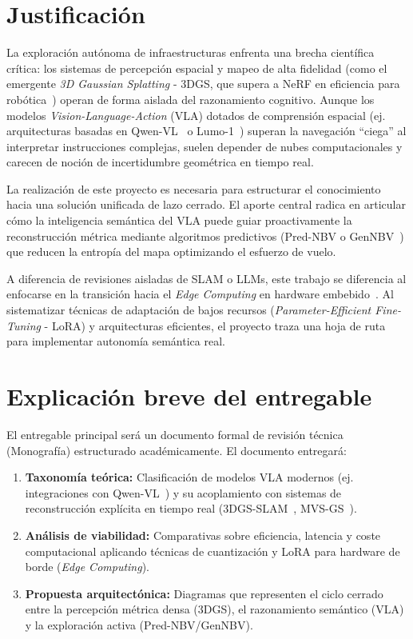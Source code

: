 \documentclass[12pt,a4paper]{article}
\begin{document}
	\section{Justificación}
	\label{sec:justificacion}
	
	La exploración autónoma de infraestructuras enfrenta una brecha científica crítica: los sistemas de percepción espacial y mapeo de alta fidelidad (como el emergente \textit{3D Gaussian Splatting} - 3DGS, que supera a NeRF en eficiencia para robótica~\cite{atik2025comparative, liu2025survey3dgs}) operan de forma aislada del razonamiento cognitivo. Aunque los modelos \textit{Vision-Language-Action} (VLA) dotados de comprensión espacial (ej. arquitecturas basadas en Qwen-VL~\cite{bai2025qwen3vl} o Lumo-1~\cite{astribot2025lumo}) superan la navegación ``ciega'' al interpretar instrucciones complejas, suelen depender de nubes computacionales y carecen de noción de incertidumbre geométrica en tiempo real.
	
	La realización de este proyecto es necesaria para estructurar el conocimiento hacia una solución unificada de lazo cerrado. El aporte central radica en articular cómo la inteligencia semántica del VLA puede guiar proactivamente la reconstrucción métrica mediante algoritmos predictivos (Pred-NBV o GenNBV~\cite{dhami2023prednbv, chen2024gennbv}) que reducen la entropía del mapa optimizando el esfuerzo de vuelo.
	
	A diferencia de revisiones aisladas de SLAM o LLMs, este trabajo se diferencia al enfocarse en la transición hacia el \textit{Edge Computing} en hardware embebido~\cite{zhang2025autonomous}. Al sistematizar técnicas de adaptación de bajos recursos (\textit{Parameter-Efficient Fine-Tuning} - LoRA) y arquitecturas eficientes, el proyecto traza una hoja de ruta para implementar autonomía semántica real.
	
	\section{Explicación breve del entregable}
	\label{sec:entregable}
	
	El entregable principal será un documento formal de revisión técnica (Monografía) estructurado académicamente. El documento entregará:
	
	\begin{enumerate}
		\item \textbf{Taxonomía teórica:} Clasificación de modelos VLA modernos (ej. integraciones con Qwen-VL~\cite{bai2025qwen3vl}) y su acoplamiento con sistemas de reconstrucción explícita en tiempo real (3DGS-SLAM~\cite{cao2024mcgs}, MVS-GS~\cite{lee2025mvsgs}).
		\item \textbf{Análisis de viabilidad:} Comparativas sobre eficiencia, latencia y coste computacional aplicando técnicas de cuantización y LoRA para hardware de borde (\textit{Edge Computing}).
		\item \textbf{Propuesta arquitectónica:} Diagramas que representen el ciclo cerrado entre la percepción métrica densa (3DGS), el razonamiento semántico (VLA) y la exploración activa (Pred-NBV/GenNBV).
	\end{enumerate}
	
\end{document}
